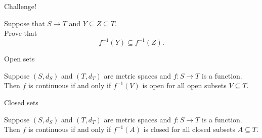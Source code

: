 \documentclass{beamer}
\begin{document}
\begin{frame}{Challenge!}
\begin{prob}
Suppose that $S\rightarrow T$ and $Y\subseteq Z\subseteq T$.\\
Prove that
$$f^{-1}(Y)\subseteq f^{-1}(Z).$$
\end{prob}
\end{frame}


\begin{frame}{Open sets}
\begin{thm}
Suppose $(S,d_S)$ and $(T,d_T)$ are metric spaces and $f: S\rightarrow T$ is a function.\\
\pause
Then $f$ is continuous if and only if $f^{-1}(V)$ is open for all open subsets $V\subseteq T$.
\end{thm}
\end{frame}

\begin{frame}{Closed sets}
\begin{thm}
Suppose $(S,d_S)$ and $(T,d_T)$ are metric spaces and $f: S\rightarrow T$ is a function.\\
\pause
Then $f$ is continuous if and only if $f^{-1}(A)$ is closed for all closed subsets $A\subseteq T$.
\end{thm}
\end{frame}
\end{document}

